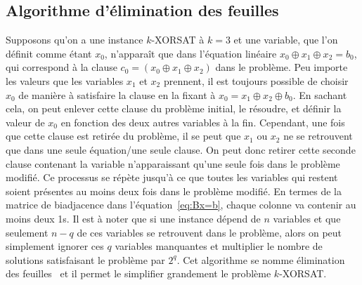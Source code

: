 \subsection{Algorithme d'élimination des feuilles}\label{subsec:leaf-removal-algorithm}
Supposons qu'on a une instance $k$-XORSAT à $k = 3$ et une variable, que l'on définit comme étant $x_0$, n'apparaît que dans l'équation linéaire $x_0 \oplus x_1 \oplus x_2 = b_0$, qui correspond à la clause $c_0 = (x_0 \oplus x_1 \oplus x_2)$ dans le problème.
Peu importe les valeurs que les variables $x_1$ et $x_2$ prennent, il est toujours possible de choisir $x_0$ de manière à satisfaire la clause en la fixant à $x_0 = x_1 \oplus x_2 \oplus b_0$.
En sachant cela, on peut enlever cette clause du problème initial, le résoudre, et définir la valeur de $x_0$ en fonction des deux autres variables à la fin. %
Cependant, une fois que cette clause est retirée du problème, il se peut que $x_1$ ou $x_2$ ne se retrouvent que dans une seule équation/une seule clause.
On peut donc retirer cette seconde clause contenant la variable n'apparaissant qu'une seule fois dans le problème modifié.
Ce processus se répète jusqu'à ce que toutes les variables qui restent soient présentes au moins deux fois dans le problème modifié.
En termes de la matrice de biadjacence dans l'équation~\ref{eq:Bx=b}, chaque colonne va contenir au moins deux 1s.
Il est à noter que si une instance dépend de $n$ variables et que seulement $n - q$ de ces variables se retrouvent dans le problème, alors on peut simplement ignorer ces $q$ variables manquantes et multiplier le nombre de solutions satisfaisant le problème par $2^q$.
Cet algorithme se nomme élimination des feuilles~\cite{mezard_alternative_2002} et il permet le simplifier grandement le problème $k$-XORSAT.


